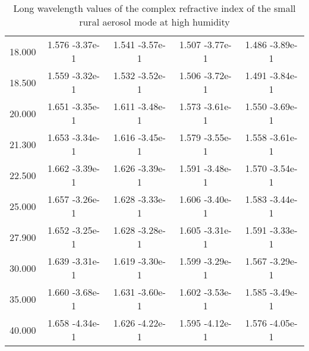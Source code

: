 \documentclass[12pt]{article}
\begin{document}
\begin{center}
\begin{table}
\begin{tabular}{| c | c | c | c | c |  }
18.000   &   1.576 -3.37e-1  &  1.541 -3.57e-1  &  1.507 -3.77e-1 &   1.486 -3.89e-1 \\
18.500   &   1.559 -3.32e-1  &  1.532 -3.52e-1 &   1.506 -3.72e-1 &   1.491 -3.84e-1 \\
20.000   &  1.651 -3.35e-1   & 1.611 -3.48e-1 &   1.573 -3.61e-1  &  1.550 -3.69e-1 \\
21.300   &  1.653 -3.34e-1  &  1.616 -3.45e-1 &   1.579 -3.55e-1  &  1.558 -3.61e-1 \\
22.500   &   1.662 -3.39e-1 &   1.626 -3.39e-1 &   1.591 -3.48e-1  &  1.570 -3.54e-1 \\
25.000   &   1.657 -3.26e-1 &   1.628 -3.33e-1 &   1.606 -3.40e-1  &  1.583 -3.44e-1 \\
27.900   &   1.652 -3.25e-1 &   1.628 -3.28e-1 &   1.605 -3.31e-1 &   1.591 -3.33e-1 \\
30.000    &  1.639 -3.31e-1  &  1.619 -3.30e-1  &  1.599 -3.29e-1   & 1.567 -3.29e-1 \\
35.000   &  1.660 -3.68e-1  &  1.631 -3.60e-1  &  1.602 -3.53e-1  &  1.585 -3.49e-1 \\
40.000   &  1.658 -4.34e-1  &  1.626 -4.22e-1  &  1.595 -4.12e-1  &  1.576 -4.05e-1 \\
\hline
\end{tabular}
\caption{Long wavelength values of the complex refractive index of the small rural aerosol mode at high humidity}
\end{table}
\end{center}
\end{document}
